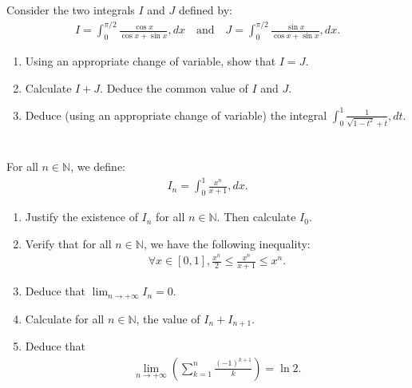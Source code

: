 \documentclass[12pt]{article}
\begin{document}
\section{}
Consider the two integrals $I$ and $J$ defined by:
\begin{align*}
I = \int_0^{\pi/2} \frac{\cos x}{\cos x + \sin x} , dx \quad \text{and} \quad J = \int_0^{\pi/2} \frac{\sin x}{\cos x + \sin x} , dx.
\end{align*}
\begin{enumerate}
\item Using an appropriate change of variable, show that $I = J$.
\item Calculate $I + J$. Deduce the common value of $I$ and $J$.
\item Deduce (using an appropriate change of variable) the integral $\int_0^1 \frac{1}{\sqrt{1-t^2} + t} , dt$.
\end{enumerate}

\newpage

\begin{answerbox}


\end{answerbox}

\newpage

\section{}
For all $n \in \mathbb{N}$, we define:
\begin{align*}
I_n = \int_0^1 \frac{x^n}{x+1} , dx.
\end{align*}
\begin{enumerate}
\item Justify the existence of $I_n$ for all $n \in \mathbb{N}$. Then calculate $I_0$.
\item Verify that for all $n \in \mathbb{N}$, we have the following inequality:
\begin{align*}
\forall x \in [0, 1], \frac{x^n}{2} \leq \frac{x^n}{x+1} \leq x^n.
\end{align*}
\item Deduce that $\lim_{n \to +\infty} I_n = 0$.
\item Calculate for all $n \in \mathbb{N}$, the value of $I_n + I_{n+1}$.
\item Deduce that
\begin{align*}
\lim_{n \to +\infty} \left( \sum_{k=1}^n \frac{(-1)^{k+1}}{k} \right) = \ln 2.
\end{align*}
\end{enumerate}

\newpage

\begin{answerbox}


\end{answerbox}

\end{document}
